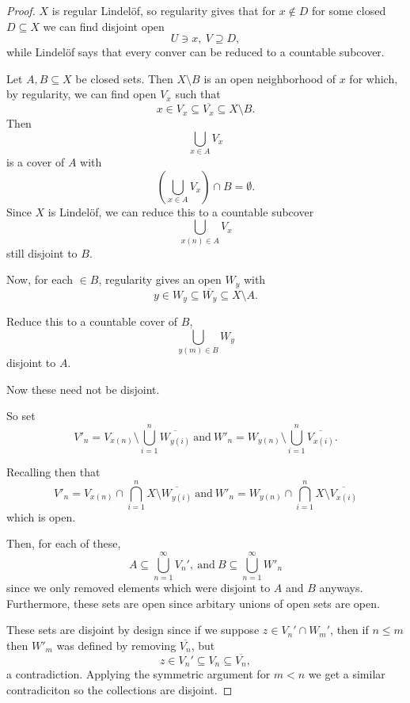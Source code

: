 \documentclass[11pt]{article}
\begin{document}
\begin{proof}
    $X$ is regular Lindel{\"o}f, so 
    regularity gives that for $x \not\in D$ for 
    some closed $D\subseteq X$ we can find 
    disjoint open 
    \[
        U \ni x, \ V \supseteq D, 
    \]    
    while Lindel{\"o}f says that 
    every conver can be reduced to a 
    countable subcover. 

    Let $A,B \subseteq X$ be closed sets. 
    Then $X \setminus B$ is an open neighborhood 
    of $x$ for which, 
    by regularity, we can find open $V_x$ such that 
    \[
        x \in V_x \subseteq \overline{V_x} 
        \subseteq X \setminus B. 
    \]
    Then 
    \[
        \bigcup_{x \in A} V_x 
    \]
    is a cover of $A$ with 
    \[
        \left(\bigcup_{x\in A} V_x\right) 
        \cap B = \emptyset. 
    \]
    Since $X$ is Lindel{\"o}f, we can reduce 
    this to a countable subcover 
    \[
        \bigcup_{x(n) \in A} V_x 
    \]
    still disjoint to $B$.

    Now, for each $ \in B$, regularity gives 
    an open $W_y$ with 
    \[
        y \in W_y \subseteq \overline{W_y} 
        \subseteq X \setminus A. 
    \]

    Reduce this to a countable cover of $B$, 
    \[
        \bigcup_{y(m) \in B} W_y  
    \]
    disjoint to $A$. 

    Now these need not be disjoint. 

    So set 
    \[
        V'_n = V_{x(n)} \setminus \bigcup_{i=1}^n 
        \overline{W_{y(i)}} \ \text{and} \ 
        W'_n = W_{y(n)} \setminus 
        \bigcup_{i=1}^n \overline{V_{x(i)}}. 
    \]

    Recalling then that 
    \[
        V'_n = V_{x(n)} \cap \bigcap_{i=1}^n X
        \setminus \overline{W_{y(i)}} \ \text{and} \  
        W'_n = W_{y(n)} \cap \bigcap_{i=1}^n X \setminus 
        \overline{V_{x(i)}}
    \] 
    which is open. 

    Then, for each of these, 
    \[
        A \subseteq \bigcup_{n=1}^\infty V_{n}', \ \text{and} \ 
        B \subseteq \bigcup_{n=1}^\infty W'_{n} 
    \]
    since we only removed 
    elements which were disjoint to 
    $A$ and $B$ anyways. 
    Furthermore, these sets are open since arbitary 
    unions of open sets are open. 

    These sets are disjoint by design since if 
    we suppose $z \in V_{n}' \cap W_{m}'$, then if 
    $n \leq m$ then $W'_m$ was defined 
    by removing $\overline{V_n}$, but 
    \[
        z \in V_n' \subseteq V_n \subseteq \overline{V_n}, 
    \]
    a contradiction. 
    Applying the symmetric argument for $m < n$ we 
    get a similar contradiciton so 
    the collections are disjoint. 


\end{proof}
\end{document}
